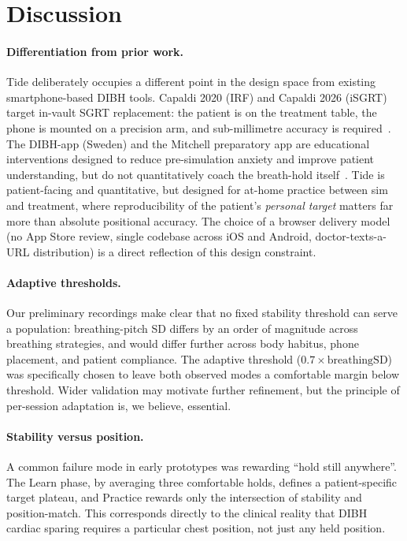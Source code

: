 \documentclass[3p,times]{elsarticle}
\begin{document}
\section{Discussion}

\paragraph{Differentiation from prior work.} Tide deliberately occupies
a different point in the design space from existing
smartphone-based DIBH tools. Capaldi 2020 (IRF) and Capaldi 2026
(iSGRT) target in-vault SGRT replacement: the patient is on the
treatment table, the phone is mounted on a precision arm, and
sub-millimetre accuracy is required~\cite{capaldi2020,capaldi2026}.
The DIBH-app (Sweden) and the Mitchell preparatory app are
educational interventions designed to reduce pre-simulation
anxiety and improve patient understanding, but do not
quantitatively coach the breath-hold
itself~\cite{dibhapp,mitchell2025prep}. Tide is patient-facing and
quantitative, but designed for at-home practice between sim and
treatment, where reproducibility of the patient's
\emph{personal target} matters far more than absolute positional
accuracy. The choice of a browser delivery model (no App Store
review, single codebase across iOS and Android, doctor-texts-a-URL
distribution) is a direct reflection of this design constraint.

\paragraph{Adaptive thresholds.} Our preliminary recordings make
clear that no fixed stability threshold can serve a population:
breathing-pitch SD differs by an order of magnitude across
breathing strategies, and would differ further across body
habitus, phone placement, and patient compliance. The adaptive
threshold ($0.7 \times \text{breathingSD}$) was specifically
chosen to leave both observed modes a comfortable margin below
threshold. Wider validation may motivate further refinement, but
the principle of per-session adaptation is, we believe, essential.

\paragraph{Stability versus position.} A common failure mode in
early prototypes was rewarding ``hold still anywhere''. The Learn
phase, by averaging three comfortable holds, defines a
patient-specific target plateau, and Practice rewards only the
intersection of stability and position-match. This corresponds
directly to the clinical reality that DIBH cardiac sparing
requires a particular chest position, not just any held position.
\end{document}

